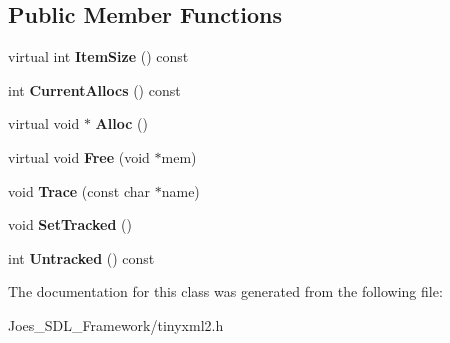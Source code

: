 \subsection*{Public Member Functions}
\begin{DoxyCompactItemize}
\item 
\hypertarget{classtinyxml2_1_1_mem_pool_t_a7ec8778fe99f6e332615a703be0b48bc}{virtual int {\bfseries Item\-Size} () const }\label{classtinyxml2_1_1_mem_pool_t_a7ec8778fe99f6e332615a703be0b48bc}

\item 
\hypertarget{classtinyxml2_1_1_mem_pool_t_a56be11b7db6a7ef00db17088a7769aab}{int {\bfseries Current\-Allocs} () const }\label{classtinyxml2_1_1_mem_pool_t_a56be11b7db6a7ef00db17088a7769aab}

\item 
\hypertarget{classtinyxml2_1_1_mem_pool_t_aa9d785a48ffe6ea1be679bab13464486}{virtual void $\ast$ {\bfseries Alloc} ()}\label{classtinyxml2_1_1_mem_pool_t_aa9d785a48ffe6ea1be679bab13464486}

\item 
\hypertarget{classtinyxml2_1_1_mem_pool_t_a4f1a0c434e9e3d7391e5c16ed4ee8c70}{virtual void {\bfseries Free} (void $\ast$mem)}\label{classtinyxml2_1_1_mem_pool_t_a4f1a0c434e9e3d7391e5c16ed4ee8c70}

\item 
\hypertarget{classtinyxml2_1_1_mem_pool_t_a0bc596f271e0f139822c534238b3f244}{void {\bfseries Trace} (const char $\ast$name)}\label{classtinyxml2_1_1_mem_pool_t_a0bc596f271e0f139822c534238b3f244}

\item 
\hypertarget{classtinyxml2_1_1_mem_pool_t_a7798932414916199a1bc0f9c3f368521}{void {\bfseries Set\-Tracked} ()}\label{classtinyxml2_1_1_mem_pool_t_a7798932414916199a1bc0f9c3f368521}

\item 
\hypertarget{classtinyxml2_1_1_mem_pool_t_a524b90d0edeac41964c06510757dce0f}{int {\bfseries Untracked} () const }\label{classtinyxml2_1_1_mem_pool_t_a524b90d0edeac41964c06510757dce0f}

\end{DoxyCompactItemize}


The documentation for this class was generated from the following file\-:\begin{DoxyCompactItemize}
\item 
Joes\-\_\-\-S\-D\-L\-\_\-\-Framework/tinyxml2.\-h\end{DoxyCompactItemize}

